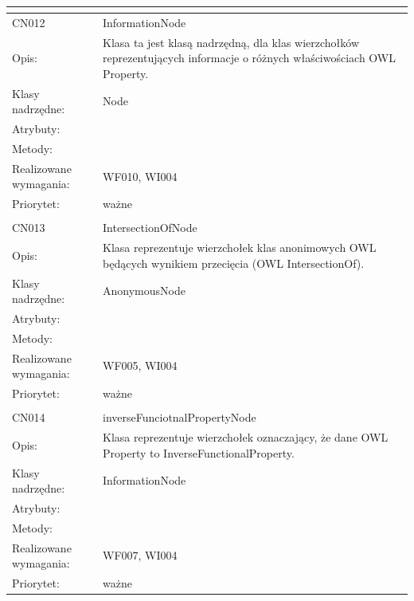 \begin{center}
\begin{longtable}{|m{3cm}|m{9cm}|}
\multicolumn{2}{c}{} \\
 \hline

CN012 & InformationNode \\ \hline
Opis: & Klasa ta jest klasą nadrzędną, dla klas wierzchołków reprezentujących informacje o różnych właściwościach OWL Property.    \\ \hline
Klasy nadrzędne: & Node     \\ \hline
Atrybuty: & %
 \\ \hline
Metody: & %
  \\ \hline
Realizowane wymagania: & WF010, WI004 \\ \hline
Priorytet: & ważne  \\ \hline

\multicolumn{2}{c}{} \\
 \hline

CN013 & IntersectionOfNode \\ \hline
Opis: & Klasa reprezentuje wierzchołek klas anonimowych OWL będących wynikiem przecięcia (OWL IntersectionOf).    \\ \hline
Klasy nadrzędne: & AnonymousNode     \\ \hline
Atrybuty: & %
 \\ \hline
Metody: & %
  \\ \hline
Realizowane wymagania: & WF005, WI004 \\ \hline
Priorytet: & ważne  \\ \hline

\multicolumn{2}{c}{} \\
 \hline

CN014 & inverseFunciotnalPropertyNode \\ \hline
Opis: & Klasa reprezentuje wierzchołek oznaczający, że dane OWL Property to InverseFunctionalProperty.    \\ \hline
Klasy nadrzędne: & InformationNode     \\ \hline
Atrybuty: & %
 \\ \hline
Metody: & %
  \\ \hline
Realizowane wymagania: & WF007, WI004 \\ \hline
Priorytet: & ważne  \\ \hline


\end{longtable}
\end{center}
